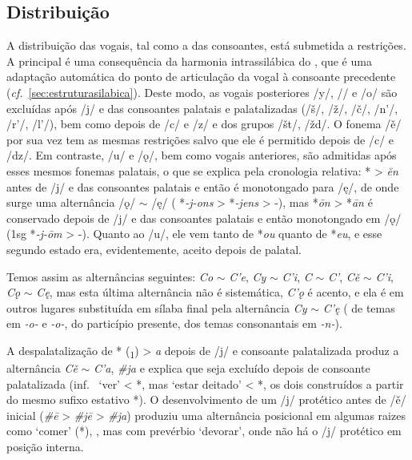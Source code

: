 \subsection{Distribuição}\label{sec:distrvogais}
A distribuição das vogais, tal como a das consoantes, está submetida a
restrições.
A principal é uma consequência da harmonia intrassilábica do , que é
uma adaptação automática do ponto de articulação da vogal à consoante precedente
(\emph{cf.}~\ref{sec:estruturasilabica}).
Deste modo, as vogais posteriores /y/, /\jeru{}/ e /o/ são excluídas após
/j/ e das consoantes palatais e palatalizadas (/š/, /ž/, /č/, /n'/, /r'/, /l'/),
bem como depois de /c/ e /z/ e dos grupos /št/, /žd/.
O fonema /ě/ por sua vez tem as mesmas restrições salvo que ele é permitido
depois de /c/ e /dz/.
Em contraste, /u/ e /ǫ/, bem como vogais anteriores, são admitidas após esses
mesmos fonemas palatais, o que se explica pela cronologia relativa:
* > \emph{ĕn} antes de /j/ e das consoantes palatais e então é
monotongado para /ę/, de onde surge uma alternância /ǫ/ $\sim$ /ę/
( *\emph{-j-ons} > *\emph{-jens} > -), mas
*\emph{ōn} > *\emph{ān} é conservado depois de /j/ e das consoantes palatais e
então monotongado em /ǫ/ (1sg *\emph{-j-ōm} > -).
Quanto ao /u/, ele vem tanto de *\emph{ou} quanto de *\emph{eu}, e esse segundo
estado era, evidentemente, aceito depois de palatal.

Temos assim as alternâncias seguintes: \emph{Co} $\sim$ \emph{C'e}, \emph{Cy}
$\sim$ \emph{C'i}, \emph{C\jeru{}} $\sim$ \emph{C'\jeri{}}, \emph{Cě}
$\sim$ \emph{C'i}, \emph{Cǫ} $\sim$ \emph{Cę}, mas esta última alternância não é
sistemática, \emph{C'ǫ} é acento, e ela é em outros lugares substituída em
sílaba final pela alternância \emph{Cy} $\sim$ \emph{C'ę}
( de temas em \emph{-o-} e \emph{-o-},
 do particípio presente,  dos temas
consonantais em \emph{-n-}).

A despalatalização de * (\textsubscript{1}) > \emph{a}
depois de /j/ e consoante palatalizada produz a alternância \emph{Cě} $\sim$
\emph{C'a}, \emph{\#ja} e explica que  seja excluído depois de consoante
palatalizada (inf.\  `ver' <
*, mas  `estar deitado' <
*, os dois construídos a partir do mesmo sufixo estativo
*).
O desenvolvimento de um /j/ protético antes de /ě/ inicial (\emph{\#ē} >
\emph{\#jē} > \emph{\#ja}) produziu uma alternância posicional em algumas raizes
como   `comer' (*), 
, mas com prevérbio
 `devorar', onde não há o /j/ protético em
posição interna.


